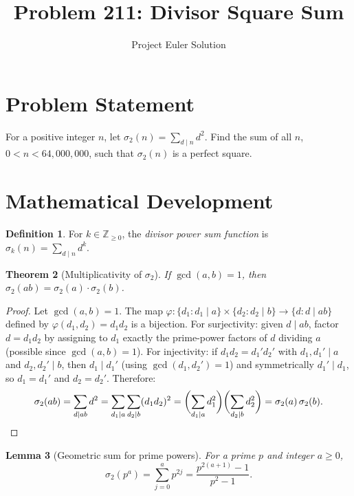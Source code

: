 \documentclass[12pt]{article}
\title{Problem 211: Divisor Square Sum}
\author{Project Euler Solution}
\date{}
\newtheorem{theorem}{Theorem}
\newtheorem{lemma}[theorem]{Lemma}
\theoremstyle{definition}
\newtheorem{definition}[theorem]{Definition}
\begin{document}
\maketitle

\section{Problem Statement}

For a positive integer $n$, let $\sigma_2(n) = \sum_{d \mid n} d^2$. Find the sum of all $n$, $0 < n < 64{,}000{,}000$, such that $\sigma_2(n)$ is a perfect square.

\section{Mathematical Development}

\begin{definition}
For $k \in \mathbb{Z}_{\geq 0}$, the \emph{divisor power sum function} is $\sigma_k(n) = \sum_{d \mid n} d^k$.
\end{definition}

\begin{theorem}[Multiplicativity of $\sigma_2$]
If $\gcd(a, b) = 1$, then $\sigma_2(ab) = \sigma_2(a) \cdot \sigma_2(b)$.
\end{theorem}

\begin{proof}
Let $\gcd(a,b) = 1$. The map $\varphi\colon \{d_1 : d_1 \mid a\} \times \{d_2 : d_2 \mid b\} \to \{d : d \mid ab\}$ defined by $\varphi(d_1, d_2) = d_1 d_2$ is a bijection. For surjectivity: given $d \mid ab$, factor $d = d_1 d_2$ by assigning to $d_1$ exactly the prime-power factors of $d$ dividing $a$ (possible since $\gcd(a,b)=1$). For injectivity: if $d_1 d_2 = d_1' d_2'$ with $d_1,d_1' \mid a$ and $d_2,d_2' \mid b$, then $d_1 \mid d_1'$ (using $\gcd(d_1,d_2')=1$) and symmetrically $d_1' \mid d_1$, so $d_1 = d_1'$ and $d_2 = d_2'$. Therefore:
\[
\sigma_2(ab) = \sum_{d \mid ab} d^2 = \sum_{d_1 \mid a}\sum_{d_2 \mid b}(d_1 d_2)^2 = \biggl(\sum_{d_1 \mid a} d_1^2\biggr)\biggl(\sum_{d_2 \mid b} d_2^2\biggr) = \sigma_2(a)\,\sigma_2(b). \qedhere
\]
\end{proof}

\begin{lemma}[Geometric sum for prime powers]
For a prime $p$ and integer $a \geq 0$,
\[
\sigma_2(p^a) = \sum_{j=0}^{a} p^{2j} = \frac{p^{2(a+1)} - 1}{p^2 - 1}.
\]
\end{lemma}
\end{document}
